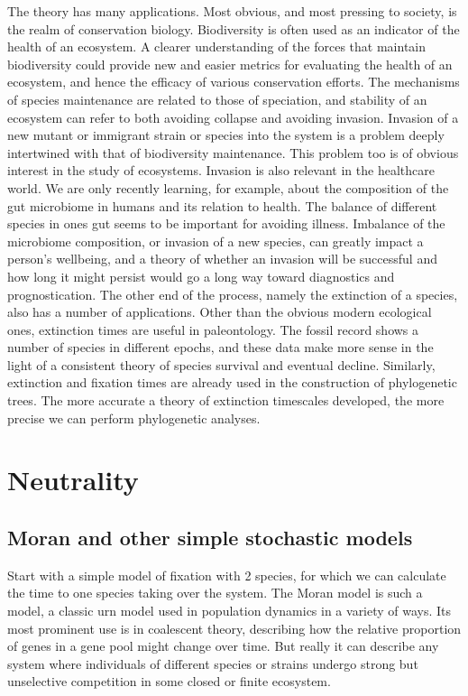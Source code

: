 The theory has many applications. 
Most obvious, and most pressing to society, is the realm of conservation biology. Biodiversity is often used as an indicator of the health of an ecosystem. A clearer understanding of the forces that maintain biodiversity could provide new and easier metrics for evaluating the health of an ecosystem, and hence the efficacy of various conservation efforts. 
The mechanisms of species maintenance are related to those of speciation, and stability of an ecosystem can refer to both avoiding collapse and avoiding invasion. Invasion of a new mutant or immigrant strain or species into the system is a problem deeply intertwined with that of biodiversity maintenance. This problem too is of obvious interest in the study of ecosystems. 
Invasion is also relevant in the healthcare world. We are only recently learning, for example, about the composition of the gut microbiome in humans and its relation to health. The balance of different species in ones gut seems to be important for avoiding illness. Imbalance of the microbiome composition, or invasion of a new species, can greatly impact a person's wellbeing, and a theory of whether an invasion will be successful and how long it might persist would go a long way toward diagnostics and prognostication. 
The other end of the process, namely the extinction of a species, also has a number of applications. Other than the obvious modern ecological ones, extinction times are useful in paleontology. The fossil record shows a number of species in different epochs, and these data make more sense in the light of a consistent theory of species survival and eventual decline. 
Similarly, extinction and fixation times are already used in the construction of phylogenetic trees. The more accurate a theory of extinction timescales developed, the more precise we can perform phylogenetic analyses. 




\section{Neutrality}
\subsection{Moran and other simple stochastic models}
Start with a simple model of fixation with 2 species, for which we can calculate the time to one species taking over the system. 
The Moran model \cite{Moran1962} is such a model, a classic urn model used in population dynamics in a variety of ways. 
Its most prominent use is in coalescent theory, describing how the relative proportion of genes in a gene pool might change over time. 
But really it can describe any system where individuals of different species or strains undergo strong but unselective competition in some closed or finite ecosystem. 

